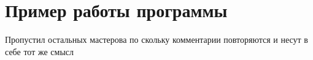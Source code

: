 \section{Пример работы программы}

Пропустил остальных мастерова по скольку комментарии повторяются и несут в себе тот же смысл




